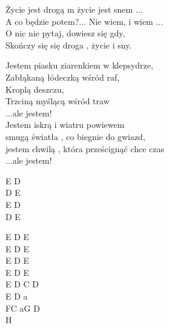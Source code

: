 \begin{text}
    Życie jest drogą m życie jest snem ...\\
    A co będzie potem?... Nie wiem, i wiem ...\\
    O nic nie pytaj, dowiesz się gdy,\\
    Skończy się się droga , życie i sny.

    Jestem piasku ziarenkiem w klepsydrze,\\
    Zabłąkaną łódeczką wśród raf,\\
    Kroplą deszczu,\\
    Trzciną myślącą wśród traw\\
    ...ale jestem!\\
    Jestem iskrą i wiatru powiewem\\
    smugą światła , co biegnie do gwiazd,\\
    jestem chwilą , która prześcignąć chce czas\\
    ...ale jestem!
\end{text}
\begin{chord}
    E D\\
    D E\\
    E D\\
    D E

    E D E\\
    E D E\\
    E D E\\
    E D E\\
    E D C D\\
    E D a\\
    FC aG D\\
    H
\end{chord}